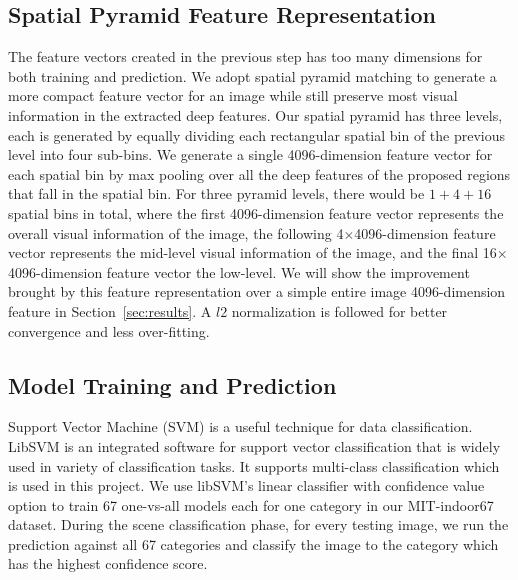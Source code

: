 \subsection{Spatial Pyramid Feature Representation}
The feature vectors created in the previous step has too many dimensions for
both training and prediction. We adopt spatial pyramid matching to generate
a more compact feature vector for an image while still preserve most visual
information in the extracted deep features.  Our spatial pyramid has three
levels, each is generated by equally dividing each rectangular spatial bin of
the previous level into four sub-bins. We generate a single 4096-dimension
feature vector for each spatial bin by max pooling over all the deep features
of the proposed regions that fall in the spatial bin. For three pyramid levels,
there would be $1+4+16$ spatial bins in total, where the first 4096-dimension
feature vector represents the overall visual information of the image, the
following 4$\times$4096-dimension feature vector represents the mid-level
visual information of the image, and the final 16$\times$4096-dimension feature
vector the low-level. We will show the improvement brought by this feature
representation over a simple entire image 4096-dimension feature in
Section~\ref{sec:results}. A $l2$ normalization is followed for better
convergence and less over-fitting.

\subsection{Model Training and Prediction}
Support Vector Machine (SVM) is a useful technique for data classification.
LibSVM\cite{Chang:2011:CC01a} is an integrated software for support vector
classification that is widely used in variety of classification tasks.  It
supports multi-class classification which is used in this project.  We use
libSVM's linear classifier with confidence value option to train 67 one-vs-all
models each for one category in our MIT-indoor67 dataset. During the scene
classification phase, for every testing image, we run the prediction against
all 67 categories and classify the image to the category which has the highest
confidence score.
